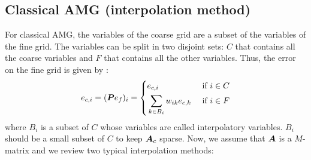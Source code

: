 \subsection{Classical AMG (interpolation method)}
For classical AMG, the variables of the coarse grid are a subset of the
variables of the fine grid. The variables can be split in two disjoint
sets: $C$ that contains all the coarse variables and $F$ that contains all the
other variables. Thus, the error on the fine grid is given by \cite{review_amg}:
\begin{equation}
  e_{c,i} = (\boldsymbol{P} e_f)_i = \left\{
  \begin{aligned}
    & e_{c,i} & \textrm{ if } i\in C\\
    & \sum_{k\in B_i} w_{ik} e_{c,k} & \textrm{ if } i\in F
  \end{aligned}
  \right.
\end{equation}
where $B_i$ is a subset of $C$ whose variables are called interpolatory
variables. $B_i$ should be a small subset of $C$ to keep $\boldsymbol{A}_c$ sparse.
Now, we assume that $\boldsymbol{A}$ is a $M$-matrix and we review two typical 
interpolation methods:
